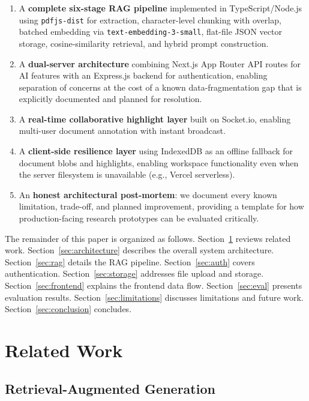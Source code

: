 \documentclass[conference]{IEEEtran}
\begin{document}
\begin{enumerate}[leftmargin=*]
  \item A \textbf{complete six-stage RAG pipeline} implemented in TypeScript/Node.js using \texttt{pdfjs-dist} for extraction, character-level chunking with overlap, batched embedding via \texttt{text-embedding-3-small}, flat-file JSON vector storage, cosine-similarity retrieval, and hybrid prompt construction.
  \item A \textbf{dual-server architecture} combining Next.js App Router API routes for AI features with an Express.js backend for authentication, enabling separation of concerns at the cost of a known data-fragmentation gap that is explicitly documented and planned for resolution.
  \item A \textbf{real-time collaborative highlight layer} built on Socket.io, enabling multi-user document annotation with instant broadcast.
  \item A \textbf{client-side resilience layer} using IndexedDB as an offline fallback for document blobs and highlights, enabling workspace functionality even when the server filesystem is unavailable (e.g., Vercel serverless).
  \item An \textbf{honest architectural post-mortem}: we document every known limitation, trade-off, and planned improvement, providing a template for how production-facing research prototypes can be evaluated critically.
\end{enumerate}

The remainder of this paper is organized as follows. Section~\ref{sec:related} reviews related work. Section~\ref{sec:architecture} describes the overall system architecture. Section~\ref{sec:rag} details the RAG pipeline. Section~\ref{sec:auth} covers authentication. Section~\ref{sec:storage} addresses file upload and storage. Section~\ref{sec:frontend} explains the frontend data flow. Section~\ref{sec:eval} presents evaluation results. Section~\ref{sec:limitations} discusses limitations and future work. Section~\ref{sec:conclusion} concludes.

\section{Related Work}
\label{sec:related}

\subsection{Retrieval-Augmented Generation}
\end{document}
